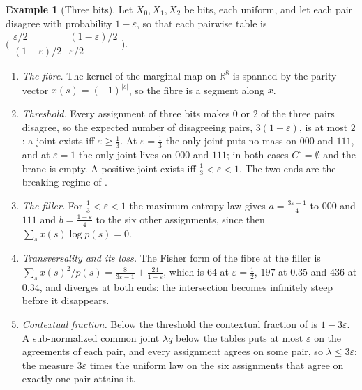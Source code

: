 \documentclass[11pt]{article}
\theoremstyle{definition}
\newtheorem{example}[theorem]{Example}
\theoremstyle{remark}
\newcommand{\R}{\mathbb{R}}
\begin{document}
\begin{example}[Three bits]\label{ex:threebits}
Let $X_0,X_1,X_2$ be bits, each uniform, and let each pair disagree with probability $1-\varepsilon$, so that each pairwise table is
$\bigl(\begin{smallmatrix}\varepsilon/2&(1-\varepsilon)/2\\(1-\varepsilon)/2&\varepsilon/2\end{smallmatrix}\bigr)$.
\begin{enumerate}[label=(\roman*)]
\item \emph{The fibre.} The kernel of the marginal map on $\R^8$ is spanned by the parity vector $x(s)=(-1)^{\lvert s\rvert}$, so the fibre
  is a segment along $x$.
\item \emph{Threshold.} Every assignment of three bits makes $0$ or $2$ of the three pairs disagree, so the expected number of
  disagreeing pairs, $3(1-\varepsilon)$, is at most $2$: a joint exists iff $\varepsilon\ge\frac13$. At $\varepsilon=\frac13$ the only joint puts no
  mass on $000$ and $111$, and at $\varepsilon=1$ the only joint lives on $000$ and $111$; in both cases $C^\circ=\emptyset$ and the brane is
  empty. A positive joint exists iff $\frac13<\varepsilon<1$. The two ends are the breaking regime of \cite{Bands}.
\item \emph{The filler.} For $\frac13<\varepsilon<1$ the maximum-entropy law gives $a=\frac{3\varepsilon-1}4$ to $000$ and $111$ and $b=\frac{1-\varepsilon}4$
  to the six other assignments, since then $\sum_sx(s)\log p(s)=0$.
\item \emph{Transversality and its loss.} The Fisher form of the fibre at the filler is
  $\sum_sx(s)^2/p(s)=\frac8{3\varepsilon-1}+\frac{24}{1-\varepsilon}$, which is $64$ at $\varepsilon=\frac12$, $197$ at $0.35$ and $436$ at $0.34$, and
  diverges at both ends: the intersection becomes infinitely steep before it disappears.
\item \emph{Contextual fraction.} Below the threshold the contextual fraction of \cite{AbramskyBarbosaMansfield2017} is $1-3\varepsilon$.
  A sub-normalized common joint $\lambda q$ below the tables puts at most $\varepsilon$ on the agreements of each pair, and every
  assignment agrees on some pair, so $\lambda\le3\varepsilon$; the measure $3\varepsilon$ times the uniform law on the six assignments that agree on
  exactly one pair attains it.
\end{enumerate}
\end{example}
\end{document}
